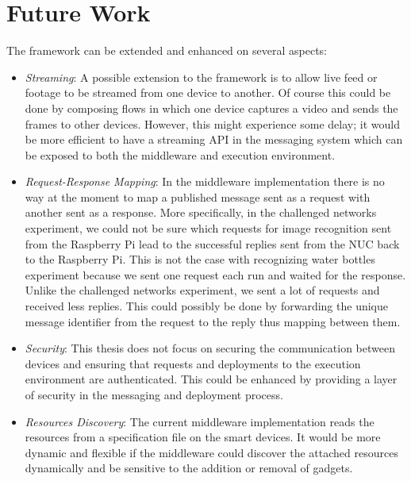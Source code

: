 \section{Future Work}
The framework can be extended and enhanced on several aspects:
\begin{itemize}
\item \textit{Streaming}: A possible extension to the framework is to allow live feed or footage to be streamed from one device to another. Of course this could be done by composing flows in which one device captures a video and sends the frames to other devices. However, this might experience some delay; it would be more efficient to have a streaming API in the messaging system which can be exposed to both the middleware and execution environment.

\item \textit{Request-Response Mapping}: In the middleware implementation there is no way at the moment to map a published message sent as a request  with another sent as a response. More specifically, in the challenged networks experiment, we could not be sure which requests for image recognition sent from the Raspberry Pi lead to the successful  replies  sent from the NUC back to the Raspberry Pi. This is not the case with recognizing water bottles experiment because we sent one request each run and waited for the response. Unlike the challenged networks experiment, we sent a lot of requests and received less replies. This could possibly be done by forwarding the unique message identifier from the request to the reply thus mapping between them.

\item \textit{Security}: This thesis does  not focus on securing the communication between devices and ensuring that requests and deployments to the execution environment are authenticated. This could be enhanced by providing a layer of security in the messaging and deployment process.

\item \textit{Resources Discovery}: The current middleware implementation reads the resources from a specification file on the smart devices. It would be more dynamic and flexible if the middleware could discover the attached resources dynamically and be sensitive to the addition or removal of gadgets. 


\end{itemize}